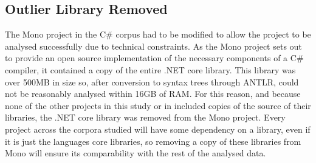 \subsection{Outlier Library Removed}
The Mono project in the C\# corpus had to be modified to allow the project to be analysed successfully due to technical constraints. As the Mono project sets out to provide an open source implementation of the necessary components of a C\# compiler, it contained a copy of the entire .NET core library. This library was over 500MB in size so, after conversion to syntax trees through ANTLR, could not be reasonably analysed within 16GB of RAM. For this reason, and because none of the other projects in this study or in \cite{QualitasCorpus} included copies of the source of their libraries, the .NET core library was removed from the Mono project. Every project across the corpora studied will have some dependency on a library, even if it is just the languages core libraries, so removing a copy of these libraries from Mono will ensure its comparability with the rest of the analysed data.
\newline

